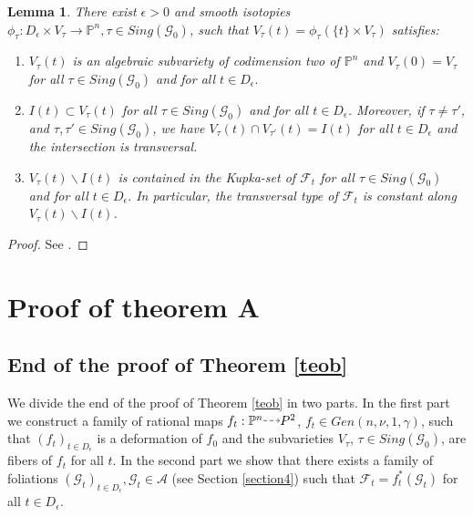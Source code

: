 \documentclass{amsart}
\newtheorem{lemma}[theorem]{Lemma}
\theoremstyle{definition}
\theoremstyle{proposition}
\numberwithin{equation}{section}
\theoremstyle{main}
\begin{document}
\begin{lemma} 
There exist $\epsilon >0$ and smooth isotopies $\phi_{\tau}:D_{\epsilon}\times V_{\tau} \to \mathbb P^n, \tau \in Sing(\mathcal G_{0})$, such that $V_{\tau}(t)=\phi_{\tau}(\{t\}\times V_{\tau})$ satisfies:
\begin{enumerate}
\item[(a)] $V_{\tau}(t)$ is an algebraic subvariety of codimension two of $\mathbb P^n$ and  $V_{\tau}(0) = V_{\tau}$ for all $ \tau \in Sing(\mathcal G_{0})$ and for all $t \in D_{\epsilon}.$
\item[(b)] $I (t) \subset V_{\tau}(t)$ for all $\tau \in Sing(\mathcal G_{0})$ and for all $t \in D_{\epsilon} $. Moreover, if $\tau \neq \tau'$, and $\tau, \tau' \in Sing(\mathcal G_{0})$,  we have $V_{\tau}(t)  \cap V_{\tau'}(t) = I(t)$ for all $t \in D_{\epsilon}$ and the intersection is transversal.
\item[(c)]   $V_{\tau}(t) \backslash I(t)$ is contained in the Kupka-set of $\mathcal{F}_t$ for all $ \tau \in Sing(\mathcal G_{0})$ and for all $t \in D_{\epsilon}.$ In particular, the transversal type of $\mathcal F_{t}$ is constant along $V_{\tau}(t) \backslash I(t)$. 
\end{enumerate}
\end{lemma}
\begin{proof}  See \cite[lema 2.3.3, p.83]{ln}.
 \end{proof}

\section{Proof of theorem A}
\subsection{End of the proof of Theorem \ref{teob}}\label{subsection5.4} 

We divide the end of the proof of Theorem \ref{teob} in two parts. In the first part we construct a family  of rational maps $f_{t}:{\mathbb{P}^n {\mathbin{\tikz [baseline=-0.25ex,-latex, dashed,->,densely dashed    ] \draw [->,densely dashed    ] (0pt,
0.5ex) -- (1.3em,0.5ex);}}{P}^2}$, $f_{t} \in Gen(n,\nu,1,\gamma)$, such that $(f_{t})_{t \in D_{\epsilon}}$ is a deformation of $f_{0}$ and the subvarieties $V_\tau$, $\tau \in Sing(\mathcal{G}_0)$, are fibers of $f_t$ for all $t$. In the second part we show that there exists a family of foliations $(\mathcal {G}_{t})_{t\in D_{\epsilon}}, \mathcal {G}_{t} \in  \mathcal A$ (see Section \ref{section4}) such that  $\mathcal{F}_{t}= f_{t}^{ \ast}(\mathcal{G}_{t})$ for all $t\in D_{\epsilon}$. 
\end{document}
